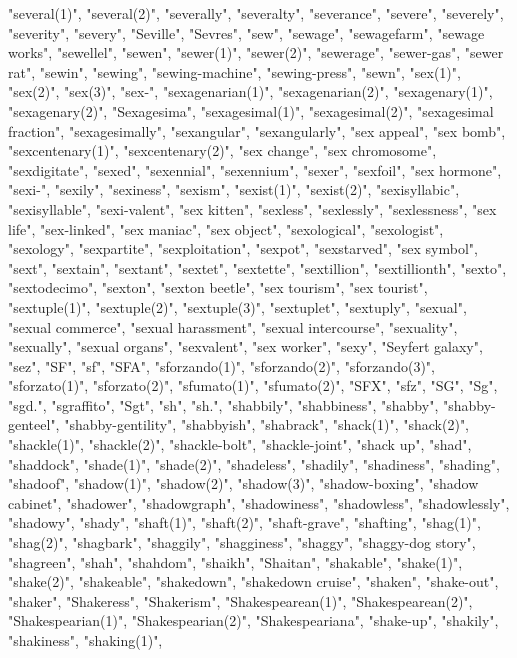 "several(1)",
"several(2)",
"severally",
"severalty",
"severance",
"severe",
"severely",
"severity",
"severy",
"Seville",
"Sevres",
"sew",
"sewage",
"sewagefarm",
"sewage works",
"sewellel",
"sewen",
"sewer(1)",
"sewer(2)",
"sewerage",
"sewer-gas",
"sewer rat",
"sewin",
"sewing",
"sewing-machine",
"sewing-press",
"sewn",
"sex(1)",
"sex(2)",
"sex(3)",
"sex-",
"sexagenarian(1)",
"sexagenarian(2)",
"sexagenary(1)",
"sexagenary(2)",
"Sexagesima",
"sexagesimal(1)",
"sexagesimal(2)",
"sexagesimal fraction",
"sexagesimally",
"sexangular",
"sexangularly",
"sex appeal",
"sex bomb",
"sexcentenary(1)",
"sexcentenary(2)",
"sex change",
"sex chromosome",
"sexdigitate",
"sexed",
"sexennial",
"sexennium",
"sexer",
"sexfoil",
"sex hormone",
"sexi-",
"sexily",
"sexiness",
"sexism",
"sexist(1)",
"sexist(2)",
"sexisyllabic",
"sexisyllable",
"sexi-valent",
"sex kitten",
"sexless",
"sexlessly",
"sexlessness",
"sex life",
"sex-linked",
"sex maniac",
"sex object",
"sexological",
"sexologist",
"sexology",
"sexpartite",
"sexploitation",
"sexpot",
"sexstarved",
"sex symbol",
"sext",
"sextain",
"sextant",
"sextet",
"sextette",
"sextillion",
"sextillionth",
"sexto",
"sextodecimo",
"sexton",
"sexton beetle",
"sex tourism",
"sex tourist",
"sextuple(1)",
"sextuple(2)",
"sextuple(3)",
"sextuplet",
"sextuply",
"sexual",
"sexual commerce",
"sexual harassment",
"sexual intercourse",
"sexuality",
"sexually",
"sexual organs",
"sexvalent",
"sex worker",
"sexy",
"Seyfert galaxy",
"sez",
"SF",
"sf",
"SFA",
"sforzando(1)",
"sforzando(2)",
"sforzando(3)",
"sforzato(1)",
"sforzato(2)",
"sfumato(1)",
"sfumato(2)",
"SFX",
"sfz",
"SG",
"Sg",
"sgd.",
"sgraffito",
"Sgt",
"sh",
"sh.",
"shabbily",
"shabbiness",
"shabby",
"shabby-genteel",
"shabby-gentility",
"shabbyish",
"shabrack",
"shack(1)",
"shack(2)",
"shackle(1)",
"shackle(2)",
"shackle-bolt",
"shackle-joint",
"shack up",
"shad",
"shaddock",
"shade(1)",
"shade(2)",
"shadeless",
"shadily",
"shadiness",
"shading",
"shadoof",
"shadow(1)",
"shadow(2)",
"shadow(3)",
"shadow-boxing",
"shadow cabinet",
"shadower",
"shadowgraph",
"shadowiness",
"shadowless",
"shadowlessly",
"shadowy",
"shady",
"shaft(1)",
"shaft(2)",
"shaft-grave",
"shafting",
"shag(1)",
"shag(2)",
"shagbark",
"shaggily",
"shagginess",
"shaggy",
"shaggy-dog story",
"shagreen",
"shah",
"shahdom",
"shaikh",
"Shaitan",
"shakable",
"shake(1)",
"shake(2)",
"shakeable",
"shakedown",
"shakedown cruise",
"shaken",
"shake-out",
"shaker",
"Shakeress",
"Shakerism",
"Shakespearean(1)",
"Shakespearean(2)",
"Shakespearian(1)",
"Shakespearian(2)",
"Shakespeariana",
"shake-up",
"shakily",
"shakiness",
"shaking(1)",
